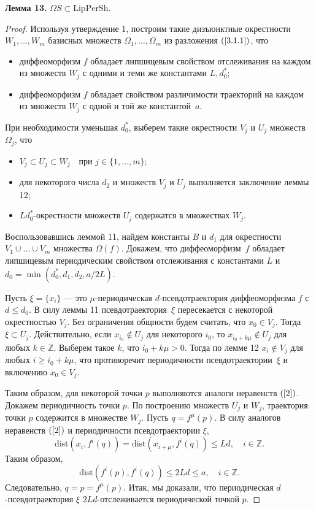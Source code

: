 \documentclass[12pt]{article}
\begin{document}
\textbf{Лемма 13.} $\Omega S\subset\mbox{LipPerSh}$.
\begin{proof}
Используя утверждение 1, построим такие дизъюнктные окрестности $W_1,\ldots,W_m$ базисных множеств $\Omega_1,\ldots,\Omega_m$ из разложения $(\ref{3.1.1})$, что
\begin{itemize}
	\item диффеоморфизм $f$ обладает липшицевым свойством отслеживания на каждом из множеств $W_j$ с одними и теми же константами $L,d_0^*$;
	\item диффеоморфизм $f$ обладает свойством различимости траекторий на каждом из множеств $W_j$ с одной и той же константой~$a$. 
\end{itemize}
При необходимости уменьшая $d_0^*$, выберем такие окрестности $V_j$ и $U_j$ множеств $\Omega_j$, что
\begin{itemize}
	\item $V_j\subset U_j\subset W_j\quad\mbox{при }j\in\{1,\ldots,m\}$;
	\item для некоторого числа $d_2$ и множеств $V_j$ и $U_j$ выполняется заключение леммы 12;
	\item $Ld_0^*$-окрестности множеств $U_j$ содержатся в множествах $W_j$.
\end{itemize}
Воспользовавшись леммой 11, найдем константы $B$ и $d_1$ для окрестности $V_1\cup\ldots\cup V_m$ множества $\Omega(f)$.
Докажем, что диффеоморфизм~$f$ обладает липшицевым периодическим свойством отслеживания с константами $L$ и $d_0=\min(d_0^*,d_1,d_2,a/2L)$.

Пусть $\xi=\{x_i\}$ --- это $\mu$-периодическая $d$-псевдотраектория диффеоморфизма $f$ с $d\leq d_0$. В силу леммы 11 псевдотраектория~$\xi$ пересекается с некоторой окрестностью $V_j$. Без ограничения общности будем считать, что $x_0\in V_j$.
Тогда $\xi\subset U_j$. Действительно, если $x_{i_0}\notin U_j$ для некоторого $i_0$, то $x_{i_0+k\mu}\notin U_j$ для любых $k\in\mathbb{Z}$. Выберем такое $k$, что $i_0+k\mu>0$. Тогда по лемме 12 $x_i\notin V_j$ для любых $i\geq i_0+k\mu$, что противоречит периодичности псевдотраектории~$\xi$ и включению $x_0\in V_j$.

Таким образом, для некоторой точки $p$ выполняются аналоги неравенств $(\ref{2})$. Докажем периодичность точки $p$. По построению множеств $U_j$ и $W_j$, траектория точки $p$ содержится в множестве $W_j$. Пусть $q=f^{\mu}(p)$. В силу аналогов неравенств $(\ref{2})$ и периодичности псевдотраектории $\xi$,
$$\mbox{dist}(x_i,f^i(q))=\mbox{dist}(x_{i+\mu},f^i(q))\leq Ld,\quad i\in\mathbb{Z}.$$
Таким образом, 
$$\mbox{dist}(f^i(p),f^i(q))\leq 2Ld\leq a,\quad i\in\mathbb{Z}.$$  
Следовательно, $q=p=f^{\mu}(p)$. Итак, мы доказали, что периодическая $d$-псевдотраектория $\xi$ $2Ld$-отслеживается периодической точкой $p$.
\end{proof}
\end{document}
